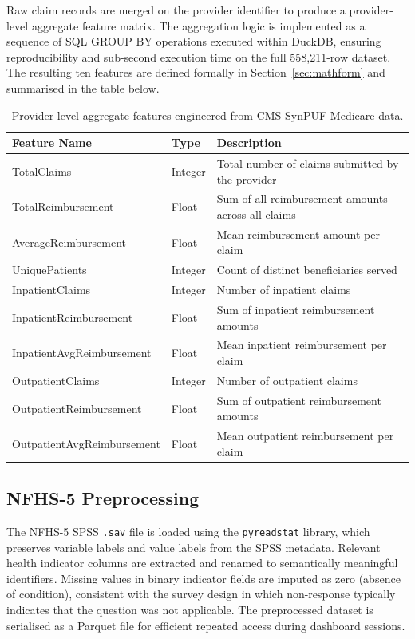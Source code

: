Raw claim records are merged on the provider identifier to produce a provider-level aggregate feature matrix. The aggregation logic is implemented as a sequence of SQL GROUP BY operations executed within DuckDB, ensuring reproducibility and sub-second execution time on the full 558,211-row dataset. The resulting ten features are defined formally in Section~\ref{sec:mathform} and summarised in the table below.

\begin{table}[htbp]
\centering
\caption{Provider-level aggregate features engineered from CMS SynPUF Medicare data.}
\label{tab:features}
\begin{tabular}{@{}lll@{}}
\toprule
\textbf{Feature Name} & \textbf{Type} & \textbf{Description} \\
\midrule
TotalClaims              & Integer  & Total number of claims submitted by the provider \\
TotalReimbursement       & Float    & Sum of all reimbursement amounts across all claims \\
AverageReimbursement     & Float    & Mean reimbursement amount per claim \\
UniquePatients           & Integer  & Count of distinct beneficiaries served \\
InpatientClaims          & Integer  & Number of inpatient claims \\
InpatientReimbursement   & Float    & Sum of inpatient reimbursement amounts \\
InpatientAvgReimbursement& Float    & Mean inpatient reimbursement per claim \\
OutpatientClaims         & Integer  & Number of outpatient claims \\
OutpatientReimbursement  & Float    & Sum of outpatient reimbursement amounts \\
OutpatientAvgReimbursement& Float   & Mean outpatient reimbursement per claim \\
\bottomrule
\end{tabular}
\end{table}

\subsection{NFHS-5 Preprocessing}

The NFHS-5 SPSS \texttt{.sav} file is loaded using the \texttt{pyreadstat} library, which preserves variable labels and value labels from the SPSS metadata. Relevant health indicator columns are extracted and renamed to semantically meaningful identifiers. Missing values in binary indicator fields are imputed as zero (absence of condition), consistent with the survey design in which non-response typically indicates that the question was not applicable. The preprocessed dataset is serialised as a Parquet file for efficient repeated access during dashboard sessions.

